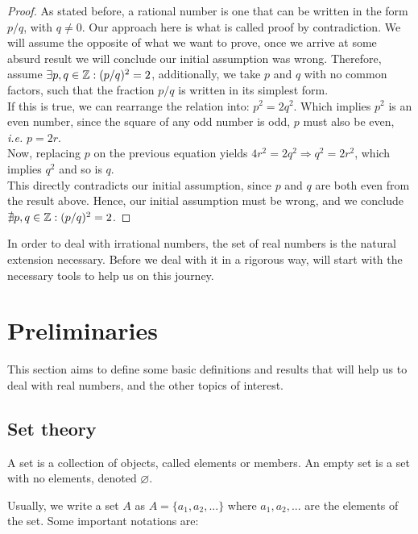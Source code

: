 \begin{proof}
    As stated before, a rational number is one that can be written in the form $p/q$, with $q \neq 0$. Our approach here is what is called proof by contradiction. We will assume the opposite of what we want to prove, once we arrive at some absurd result we will conclude our initial assumption was wrong. Therefore, assume $\exists p, q \in \mathbb{Z}: (p/q)^2 = 2$, additionally, we take $p$ and $q$ with no common factors, such that the fraction $p/q$ is written in its simplest form. \\
    If this is true, we can rearrange the relation into: $p^2 = 2 q^2$. Which implies $p^2$ is an even number, since the square of any odd number is odd, $p$ must also be even, \emph{i.e.} $p = 2r$. \\
    Now, replacing $p$ on the previous equation yields $4 r^2 = 2 q^2 \Rightarrow q^2 = 2 r^2$, which implies $q^2$ and so is $q$. \\
    This directly contradicts our initial assumption, since $p$ and $q$ are both even from the result above. Hence, our initial assumption must be wrong, and we conclude $\nexists p,q \in \mathbb{Z}: (p/q)^2=2$.
\end{proof}

In order to deal with irrational numbers, the set of real numbers is the natural extension necessary. Before we deal with it in a rigorous way, will start with the necessary tools to help us on this journey.

\section{Preliminaries}

This section aims to define some basic definitions and results that will help us to deal with real numbers, and the other topics of interest.

\subsection{Set theory}

\begin{definition}[Set]
    A set is a collection of objects, called elements or members. An empty set is a set with no elements, denoted $\varnothing$.
\end{definition}

Usually, we write a set $A$ as $A = \{ a_1, a_2, ...\}$ where $a_1, a_2, ...$ are the elements of the set. Some important notations are:

